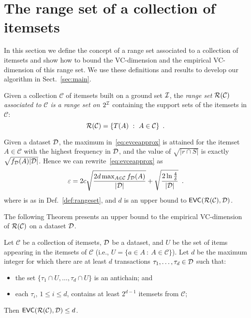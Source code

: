 \section{The range set of a collection of itemsets}\label{sec:range}
In this section we define the concept of a range set associated to a
collection of itemsets and show how to bound the VC-dimension and the
empirical VC-dimension of this range set. We use these definitions and results
to develop our algorithm in Sect.~\ref{sec:main}.

\begin{definition}\label{def:rangeset}
Given a collection $\mathcal{C}$ of itemsets built on a ground set ${\cal I}$, the
\emph{range set $\mathcal{R}(\mathcal{C})$ associated to $\mathcal{C}$ is a range
set on $2^{\cal I}$} containing the support sets of the itemsets in $\mathcal{C}$:
\[
	\mathcal{R}(\mathcal{C})=\{T(A) ~:~ A\in\mathcal{C}\}\enspace.
\]
\end{definition}

\begin{fact}\label{fact:maxfreq}
	Given  a dataset ${\cal D}$, the maximum
	in~\eqref{eq:evceapprox} is attained for the itemset $A\in\mathcal{C}$ with the
	highest frequency in ${\cal D}$, and the value of $\sqrt{|r\cap S|}$ is exactly
	$\sqrt{f_{\cal D}(A)|{\cal D}|}$. Hence we can rewrite~\eqref{eq:evceapprox} as
	\begin{equation}\label{eq:evceapproxitemsets}
		\varepsilon = 2c\sqrt{\frac{2d\max_{A\in\mathcal{C}}f_{\cal D}(A)}{|{\cal D}|}} +
		\sqrt{\frac{2\ln\frac{4}{\delta}}{|{\cal D}|}}\enspace.
	\end{equation}
	where  is as in Def.~\ref{def:rangeset}, and $d$ is an
	upper bound to $\mathsf{EVC}(\mathcal{R}(\mathcal{C}),{\cal D})$.
\end{fact}

The following Theorem presents an upper bound to the empirical VC-dimension of
$\mathcal{R}(\mathcal{C})$ on a dataset ${\cal D}$.

\begin{theorem}\label{lem:evcdimupbound}
  Let $\mathcal{C}$ be a collection of itemsets, ${\cal D}$ be a dataset, and $U$ be
  the set of items appearing in the itemsets of $\mathcal{C}$ (i.e., $U=\{a\in A ~:~
  A\in\mathcal{C}\}$). Let $d$ be the maximum integer for which there are at
  least $d$ transactions $\tau_1,\dotsc,\tau_d\in {\cal D}$ such that:
  \begin{itemize}
	\item the set $\{\tau_1\cap U,\dotsc,\tau_d\cap U\}$ is an antichain; and
	\item each $\tau_i$, $1\le i\le d$, contains at least $2^{d-1}$ itemsets
		from $\mathcal{C}$;
  \end{itemize}
  Then $\mathsf{EVC}(\mathcal{R}(\mathcal{C}),{\cal D})\le d$.
\end{theorem}


